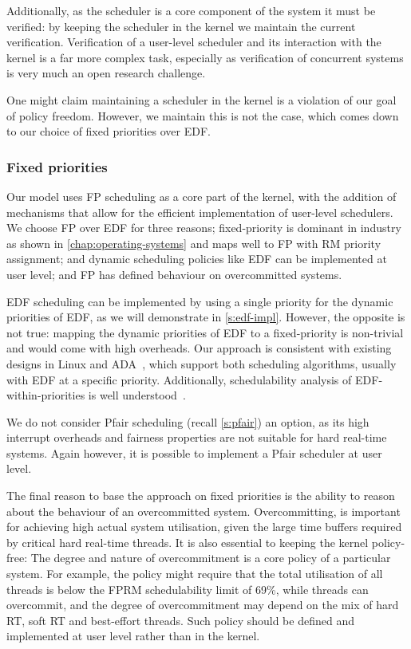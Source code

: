 Additionally, as the scheduler is a core component of the system it must be verified: by keeping the
scheduler in the kernel we maintain the current verification. Verification of a user-level scheduler
and its interaction with the kernel is a far more complex task, especially as verification of
concurrent systems is very much an open research challenge. 

One might claim maintaining a scheduler in the kernel is a violation of our goal of policy freedom.
However, we maintain this is not the case, which comes down to our choice of fixed priorities over
\gls{EDF}.

\subsubsection{Fixed priorities}

Our model uses \gls{FP} scheduling as a core part of the kernel, with the addition of mechanisms
that allow for the efficient implementation of user-level schedulers.
We choose \gls{FP} over \gls{EDF} for three reasons; 
fixed-priority is dominant in industry
as shown in \cref{chap:operating-systems} and maps well to \gls{FP} with \gls{RM} priority assignment; and dynamic scheduling policies like
\gls{EDF} can be implemented at user level; and \gls{FP} has defined behaviour on overcommitted
systems.

\gls{EDF} scheduling can be implemented by using a single priority for the dynamic
priorities of \gls{EDF}, as we will demonstrate in \cref{s:edf-impl}.
However, the opposite is not true: mapping the dynamic priorities of EDF to a fixed-priority
is non-trivial and would come with high overheads. 
Our approach is consistent with existing designs in Linux  and ADA~\citep{Burns_Wellings:crtpa}, which
support both scheduling algorithms, usually with \gls{EDF} at a specific priority. Additionally,
schedulability analysis of \gls{EDF}-within-priorities is well
understood~\citep{Harbour_Palencia_03}.

We do not consider Pfair scheduling (recall \cref{s:pfair}) an option, as its high interrupt
overheads and fairness properties are not suitable for hard real-time systems.  Again however, it is
possible to implement a Pfair scheduler at user level.

The final reason to base the approach on fixed priorities is the ability
to reason about the behaviour of an
overcommitted system. Overcommitting, is important for achieving high
actual system utilisation, given the large time buffers required by
critical hard real-time threads. It is also essential to keeping the kernel
policy-free: The degree and nature of overcommitment is a core policy
of a particular system. For example, the policy might require that the
total utilisation of all  threads is below the \gls{FPRM}
schedulability limit of 69\%, while  threads can overcommit,
and the degree of overcommitment may depend on the mix of hard RT,
soft RT and best-effort threads. Such policy should be defined and
implemented at user level rather than in the kernel.

